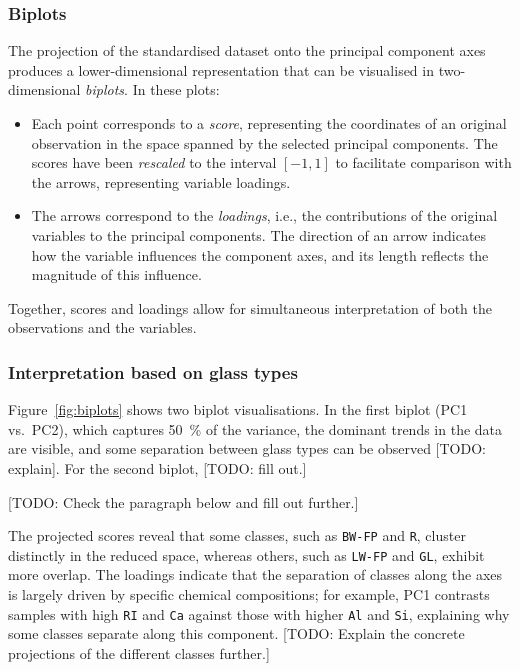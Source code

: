 \documentclass[dtu]{dtuarticle}
\newcommand{\todo}[1]{\color{red}[TODO: #1]\color{black}}
\begin{document}
	\subsubsection{Biplots}

	The projection of the standardised dataset onto the principal component axes produces a lower-dimensional representation that can be visualised in two-dimensional \textit{biplots}. In these plots:

	\begin{itemize}
		\item Each point corresponds to a \textit{score}, representing the coordinates of an original observation in the space spanned by the selected principal components. The scores have been \textit{rescaled} to the interval $[-1,1]$ to facilitate comparison with the arrows, representing variable loadings.
		\item The arrows correspond to the \textit{loadings}, i.e., the contributions of the original variables to the principal components. The direction of an arrow indicates how the variable influences the component axes, and its length reflects the magnitude of this influence.
	\end{itemize}

	Together, scores and loadings allow for simultaneous interpretation of both the observations and the variables.

	\subsubsection{Interpretation based on glass types}

	Figure~\ref{fig:biplots} shows two biplot visualisations. In the first biplot (PC1 vs.\ PC2), which captures \SI{50}{\percent} of the variance, the dominant trends in the data are visible, and some separation between glass types can be observed \todo{explain}. For the second biplot, \todo{fill out.}

	\todo{Check the paragraph below and fill out further.}

	The projected scores reveal that some classes, such as \texttt{BW-FP} and \texttt{R}, cluster distinctly in the reduced space, whereas others, such as \texttt{LW-FP} and \texttt{GL}, exhibit more overlap. The loadings indicate that the separation of classes along the axes is largely driven by specific chemical compositions; for example, PC1 contrasts samples with high \texttt{RI} and \texttt{Ca} against those with higher \texttt{Al} and \texttt{Si}, explaining why some classes separate along this component. \todo{Explain the concrete projections of the different classes further.}
\end{document}
